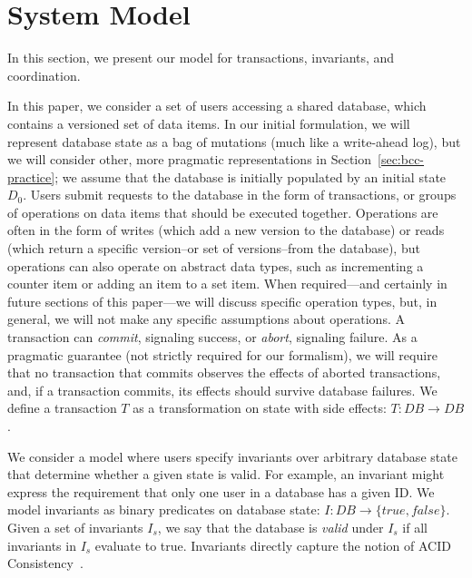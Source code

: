 
\section{System Model}
\label{sec:model}

In this section, we present our model for transactions, invariants,
and coordination.

 In this paper, we consider a set of users
accessing a shared database, which contains a versioned set of data
items. In our initial formulation, we will represent database state as
a bag of mutations (much like a write-ahead log), but we will consider
other, more pragmatic representations in
Section~\ref{sec:bcc-practice}; we assume that the database is
initially populated by an initial state $D_0$. Users submit requests
to the database in the form of transactions, or groups of operations
on data items that should be executed together. Operations are often
in the form of writes (which add a new version to the database) or
reads (which return a specific version--or set of versions--from the
database), but operations can also operate on abstract data types,
such as incrementing a counter item or adding an item to a set
item. When required---and certainly in future sections of this
paper---we will discuss specific operation types, but, in general, we
will not make any specific assumptions about operations. A transaction
can \textit{commit}, signaling success, or \textit{abort}, signaling
failure. As a pragmatic guarantee (not strictly required for our
formalism), we will require that no transaction that commits observes
the effects of aborted transactions, and, if a transaction commits,
its effects should survive database failures. We define a transaction
$T$ as a transformation on state with side effects: $T: DB \rightarrow
DB$.

 We consider a model where users specify
invariants over arbitrary database state that determine whether a
given state is valid. For example, an invariant might express the
requirement that only one user in a database has a given ID.  We model
invariants as binary predicates on database state: $I: DB \rightarrow
\{true, false\}$. Given a set of invariants $I_s$, we say that the
database is \textit{valid} under $I_s$ if all invariants in $I_s$
evaluate to true. Invariants directly capture the notion of ACID
Consistency~\cite{bernstein-book}.

